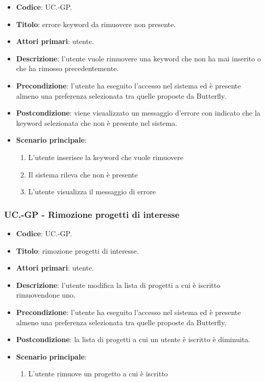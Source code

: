 	\begin{itemize}
		\item \textbf{Codice}: UC\theuccount.\thesubuccount-GP.
		\item \textbf{Titolo}: errore keyword da rimuovere non presente.
		\item \textbf{Attori primari}: utente.
		\item \textbf{Descrizione}: l'utente vuole rimuovere una keyword che non ha mai inserito o che ha rimosso precedentemente.
		\item \textbf{Precondizione}: l’utente ha eseguito l'accesso nel sistema ed è presente almeno
        una preferenza selezionata tra quelle proposte da Butterfly.
		\item \textbf{Postcondizione}: viene visualizzato un messaggio d'errore con indicato che la keyword	selezionata che non è presente nel sistema.
		\item \textbf{Scenario principale}:
		\begin{enumerate}
			\item L'utente inserisce la keyword che vuole rimuovere
			\item Il sistema rileva che non è presente
			\item L'utente visualizza il messaggio di errore
		\end{enumerate}
	\end{itemize}

    \subsubsection{UC\theuccount.\thesubuccount-GP - Rimozione progetti di interesse}

    \begin{itemize}
        \item \textbf{Codice}: UC\theuccount.\thesubuccount-GP.
        \item \textbf{Titolo}: rimozione progetti di interesse.
        \item \textbf{Attori primari}: utente.
        \item \textbf{Descrizione}: l'utente modifica la lista di progetti a cui è iscritto rimuovendone uno.
        \item \textbf{Precondizione}: l’utente ha eseguito l'accesso nel sistema ed è presente almeno
        una preferenza selezionata tra quelle proposte da Butterfly.
        \item \textbf{Postcondizione}: la lista di progetti a cui un utente è iscritto è diminuita.
        \item \textbf{Scenario principale}:
        \begin{enumerate}
            \item L'utente rimuove un progetto a cui è iscritto
        \end{enumerate}
    \end{itemize}


